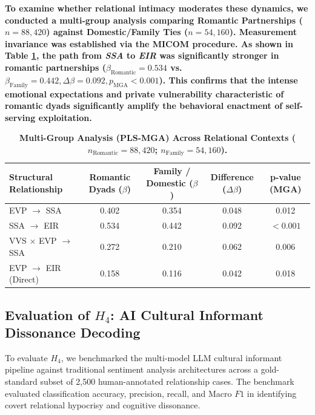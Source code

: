 \documentclass[11pt,a4paper]{article}
\newcommand{\textadded}[1]{{\color{blue!80!black}\textbf{#1}}}
\begin{document}
\textadded{To examine whether relational intimacy moderates these dynamics, we conducted a multi-group analysis comparing Romantic Partnerships ($n = 88,420$) against Domestic/Family Ties ($n = 54,160$). Measurement invariance was established via the MICOM procedure. As shown in Table \ref{tab:tracked_mga_results}, the path from \textit{SSA} to \textit{EIR} was significantly stronger in romantic partnerships ($\beta_{\text{Romantic}} = 0.534$ vs. $\beta_{\text{Family}} = 0.442, \Delta \beta = 0.092, p_{\text{MGA}} < 0.001$). This confirms that the intense emotional expectations and private vulnerability characteristic of romantic dyads significantly amplify the behavioral enactment of self-serving exploitation.}

\begin{table}[htbp]
\centering
\small
\begin{tabularx}{\textwidth}{Xcccc}
\toprule
\textbf{Structural Relationship} & \textbf{Romantic Dyads ($\beta$)} & \textbf{Family / Domestic ($\beta$)} & \textbf{Difference ($\Delta \beta$)} & \textbf{p-value (MGA)} \\
\midrule
EVP $\rightarrow$ SSA & 0.402 & 0.354 & 0.048 & 0.012 \\
SSA $\rightarrow$ EIR & 0.534 & 0.442 & 0.092 & $< 0.001$ \\
VVS $\times$ EVP $\rightarrow$ SSA & 0.272 & 0.210 & 0.062 & 0.006 \\
EVP $\rightarrow$ EIR (Direct) & 0.158 & 0.116 & 0.042 & 0.018 \\
\bottomrule
\end{tabularx}
\caption{\textadded{Multi-Group Analysis (PLS-MGA) Across Relational Contexts ($n_{\text{Romantic}} = 88,420$; $n_{\text{Family}} = 54,160$).}}
\label{tab:tracked_mga_results}
\end{table}

\subsection[Evaluation of H4: AI Cultural Informant Dissonance Decoding]{Evaluation of $H_4$: AI Cultural Informant Dissonance Decoding}
To evaluate $H_4$, we benchmarked the multi-model LLM cultural informant pipeline against traditional sentiment analysis architectures across a gold-standard subset of 2,500 human-annotated relationship cases. The benchmark evaluated classification accuracy, precision, recall, and Macro $F1$ in identifying covert relational hypocrisy and cognitive dissonance.
\end{document}
